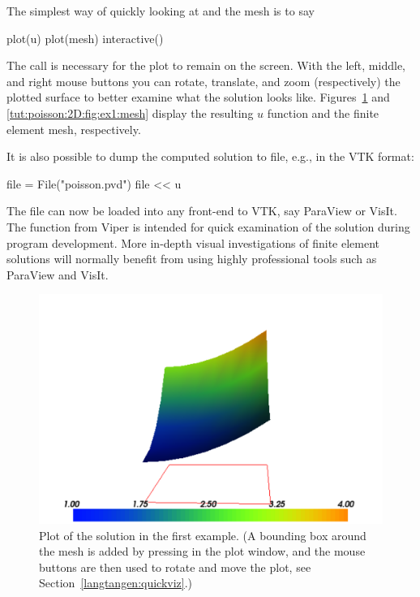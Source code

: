 The simplest way of quickly looking at  and the mesh is to say
\begin{python}
plot(u)
plot(mesh)
interactive()
\end{python}
The  call is necessary for the plot to remain on the
screen. With the left, middle, and right mouse buttons you can rotate,
translate, and zoom (respectively) the plotted surface to better examine
what the solution looks like.  Figures~\ref{tut:poisson:2D:fig:ex1:u}
and \ref{tut:poisson:2D:fig:ex1:mesh} display the resulting $u$ function
and the finite element mesh, respectively.

It is also possible to dump the computed solution to file, e.g., in the
VTK format:
\begin{python}
file = File("poisson.pvd")
file << u
\end{python}
The  file can now be loaded into any front-end to VTK,
say ParaView or VisIt. The  function from Viper is intended
for quick examination of the solution during program development.
More in-depth visual investigations of finite element solutions will
normally benefit from using highly professional tools such as ParaView
and VisIt.

\begin{figure}
  \center\includegraphics[width=\largefig]{chapters/langtangen/pdf/ex1_u.pdf}
  \caption{Plot of the solution in the first \fenics{} example.
    (A bounding box around the mesh is added by pressing  in the plot
    window, and the mouse buttons are then used to rotate and move the
    plot, see Section~\ref{langtangen:quickviz}.)}
  \label{tut:poisson:2D:fig:ex1:u}
\end{figure}

